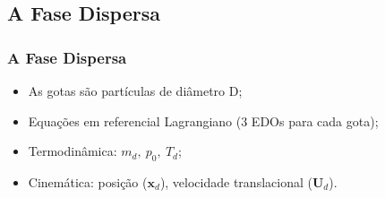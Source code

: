 \documentclass[bars,mathserif]{beamer}
\newcommand{\bv}[1]{\mathbf{#1}}
\begin{document}
%
\subsection{A Fase Dispersa}
\begin{frame}
\frametitle{A Fase Dispersa}
\begin{itemize}
 \item<2-> As gotas são partículas de diâmetro D;
 \item<3-> Equações em referencial Lagrangiano (3 EDOs para cada gota);
 \item<4-> Termodinâmica: $m_d,\ p_0,\ T_d$;
 \item<5-> Cinemática: posição ($\bv{x}_d$), velocidade translacional ($\bv{U}_d$).
\end{itemize}
 
\end{frame}
\end{document}
